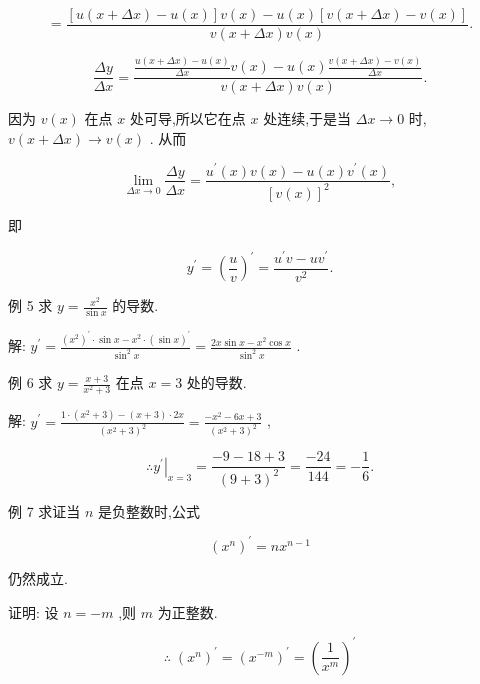 \documentclass[lang=cn,newtx,10pt,scheme=chinese]{elegantbook}
\begin{document}
\[
= \frac{\left\lbrack {u\left( {x + {\Delta x}}\right) - u\left( x\right) }\right\rbrack v\left( x\right) - u\left( x\right) \left\lbrack {v\left( {x + {\Delta x}}\right) - v\left( x\right) }\right\rbrack }{v\left( {x + {\Delta x}}\right) v\left( x\right) }.
\]

\[
\frac{\Delta y}{\Delta x} = \frac{\frac{u\left( {x + {\Delta x}}\right) - u\left( x\right) }{\Delta x}v\left( x\right) - u\left( x\right) \frac{v\left( {x + {\Delta x}}\right) - v\left( x\right) }{\Delta x}}{v\left( {x + {\Delta x}}\right) v\left( x\right) }.
\]

因为 \(v\left( x\right)\) 在点 \(x\) 处可导,所以它在点 \(x\) 处连续,于是当 \({\Delta x} \rightarrow 0\) 时, \(v\left( {x + {\Delta x}}\right) \rightarrow v\left( x\right)\) . 从而

\[
\mathop{\lim }\limits_{{{\Delta x} \rightarrow 0}}\frac{\Delta y}{\Delta x} = \frac{{u}^{\prime }\left( x\right) v\left( x\right) - u\left( x\right) {v}^{\prime }\left( x\right) }{{\left\lbrack v\left( x\right) \right\rbrack }^{2}},
\]

即

\[
{y}^{\prime } = {\left( \frac{u}{v}\right) }^{\prime } = \frac{{u}^{\prime }v - u{v}^{\prime }}{{v}^{2}}.
\]

例 5 求 \(y = \frac{{x}^{2}}{\sin x}\) 的导数.

解: \({y}^{\prime } = \frac{{\left( {x}^{2}\right) }^{\prime } \cdot \sin x - {x}^{2} \cdot {\left( \sin x\right) }^{\prime }}{{\sin }^{2}x} = \frac{{2x}\sin x - {x}^{2}\cos x}{{\sin }^{2}x}\) .

例 6 求 \(y = \frac{x + 3}{{x}^{2} + 3}\) 在点 \(x = 3\) 处的导数.

解: \({y}^{\prime } = \frac{1 \cdot \left( {{x}^{2} + 3}\right) - \left( {x + 3}\right) \cdot {2x}}{{\left( {x}^{2} + 3\right) }^{2}} = \frac{-{x}^{2} - {6x} + 3}{{\left( {x}^{2} + 3\right) }^{2}}\) ,

\[
\therefore {\left. {y}^{\prime }\right| }_{x = 3} = \frac{-9 - {18} + 3}{{\left( 9 + 3\right) }^{2}} = \frac{-{24}}{144} = - \frac{1}{6}\text{.}
\]

例 7 求证当 \(n\) 是负整数时,公式

\[
{\left( {x}^{n}\right) }^{\prime } = n{x}^{n - 1}
\]

仍然成立.

证明: 设 \(n = - m\) ,则 \(m\) 为正整数.

\[
\therefore \;{\left( {x}^{n}\right) }^{\prime } = {\left( {x}^{-m}\right) }^{\prime } = {\left( \frac{1}{{x}^{m}}\right) }^{\prime }
\]
\end{document}
